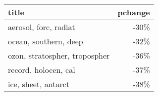 \begin{tabular}{lr}
\toprule
                         title &  pchange \\
\midrule
         aerosol, forc, radiat &     -30\% \\
         ocean, southern, deep &     -32\% \\
 ozon, stratospher, tropospher &     -36\% \\
          record, holocen, cal &     -37\% \\
           ice, sheet, antarct &     -38\% \\
\bottomrule
\end{tabular}
